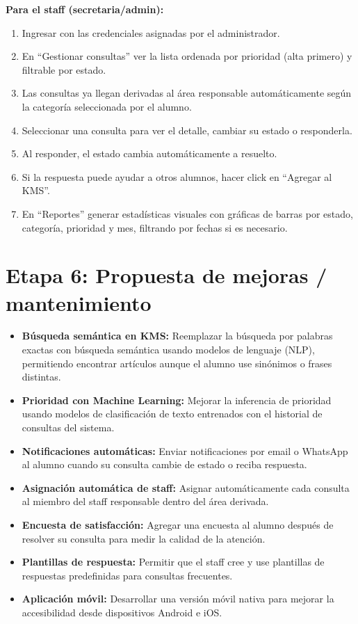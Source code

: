 \documentclass[12pt,a4paper]{article}
\begin{document}
	\textbf{Para el staff (secretaria/admin):}
	\begin{enumerate}
	\setlength{\itemindent}{1cm}
	\item Ingresar con las credenciales asignadas por el administrador.
	\item En ``Gestionar consultas'' ver la lista ordenada por prioridad (alta primero) y filtrable por estado.
	\item Las consultas ya llegan derivadas al área responsable automáticamente según la categoría seleccionada por el alumno.
	\item Seleccionar una consulta para ver el detalle, cambiar su estado o responderla.
	\item Al responder, el estado cambia automáticamente a resuelto.
	\item Si la respuesta puede ayudar a otros alumnos, hacer click en ``Agregar al KMS''.
	\item En ``Reportes'' generar estadísticas visuales con gráficas de barras por estado, categoría, prioridad y mes, filtrando por fechas si es necesario.
	\end{enumerate}

	\newpage

	\section{Etapa 6: Propuesta de mejoras / mantenimiento}

	\begin{itemize}
	\setlength{\itemindent}{1cm}
	\item \textbf{Búsqueda semántica en KMS:} Reemplazar la búsqueda por palabras exactas con búsqueda semántica usando modelos de lenguaje (NLP), permitiendo encontrar artículos aunque el alumno use sinónimos o frases distintas.
	\item \textbf{Prioridad con Machine Learning:} Mejorar la inferencia de prioridad usando modelos de clasificación de texto entrenados con el historial de consultas del sistema.
	\item \textbf{Notificaciones automáticas:} Enviar notificaciones por email o WhatsApp al alumno cuando su consulta cambie de estado o reciba respuesta.
	\item \textbf{Asignación automática de staff:} Asignar automáticamente cada consulta al miembro del staff responsable dentro del área derivada.
	\item \textbf{Encuesta de satisfacción:} Agregar una encuesta al alumno después de resolver su consulta para medir la calidad de la atención.
	\item \textbf{Plantillas de respuesta:} Permitir que el staff cree y use plantillas de respuestas predefinidas para consultas frecuentes.
	\item \textbf{Aplicación móvil:} Desarrollar una versión móvil nativa para mejorar la accesibilidad desde dispositivos Android e iOS.
	\end{itemize}
\end{document}
